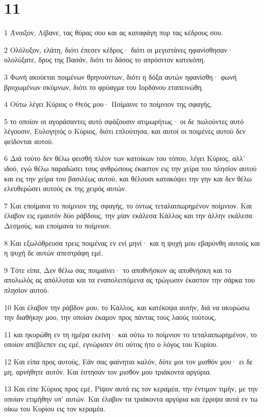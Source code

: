 \chapter{11}

\par 1 Άνοιξον, Λίβανε, τας θύρας σου και ας καταφάγη πυρ τας κέδρους σου.
\par 2 Ολόλυξον, ελάτη, διότι έπεσεν κέδρος· διότι οι μεγιστάνες ηφανίσθησαν· ολολύξατε, δρυς της Βασάν, διότι το δάσος το απρόσιτον κατεκόπη.
\par 3 Φωνή ακούεται ποιμένων θρηνούντων, διότι η δόξα αυτών ηφανίσθη· φωνή βρυχωμένων σκύμνων, διότι το φρύαγμα του Ιορδάνου εταπεινώθη.
\par 4 Ούτω λέγει Κύριος ο Θεός μου· Ποίμαινε το ποίμνιον της σφαγής,
\par 5 το οποίον οι αγοράσαντες αυτό σφάζουσιν ατιμωρήτως· οι δε πωλούντες αυτό λέγουσιν, Ευλογητός ο Κύριος, διότι επλούτησα, και αυτοί οι ποιμένες αυτού δεν φείδονται αυτού.
\par 6 Διά τούτο δεν θέλω φεισθή πλέον των κατοίκων του τόπου, λέγει Κύριος, αλλ' ιδού, εγώ θέλω παραδώσει τους ανθρώπους έκαστον εις την χείρα του πλησίον αυτού και εις την χείρα του βασιλέως αυτού, και θέλουσι κατακόψει την γην και δεν θέλω ελευθερώσει αυτούς εκ της χειρός αυτών.
\par 7 Και εποίμανα το ποίμνιον της σφαγής, το όντως τεταλαιπωρημένον ποίμνιον. Και έλαβον εις εμαυτόν δύο ράβδους, την μίαν εκάλεσα Κάλλος και την άλλην εκάλεσα Δεσμούς, και εποίμανα το ποίμνιον.
\par 8 Και εξωλόθρευσα τρεις ποιμένας εν ενί μηνί· και η ψυχή μου εβαρύνθη αυτούς και η ψυχή δε αυτών απεστράφη εμέ.
\par 9 Τότε είπα, Δεν θέλω σας ποιμαίνει· το αποθνήσκον ας αποθνήσκη και το απολωλός ας απόλλυται και τα εναπολειπόμενα ας τρώγωσιν έκαστον την σάρκα του πλησίον αυτού.
\par 10 Και έλαβον την ράβδον μου, το Κάλλος, και κατέκοψα αυτήν, διά να ακυρώσω την διαθήκην μου, την οποίαν έκαμον προς πάντας τους λαούς τούτους,
\par 11 και ηκυρώθη εν τη ημέρα εκείνη· και ούτω το ποίμνιον το τεταλαιπωρημένον, το οποίον απέβλεπεν εις εμέ, εγνώρισεν ότι ούτος ήτο ο λόγος του Κυρίου.
\par 12 Και είπα προς αυτούς, Εάν σας φαίνηται καλόν, δότε μοι τον μισθόν μου· ει δε μη, αρνήθητε αυτόν. Και έστησαν τον μισθόν μου τριάκοντα αργύρια.
\par 13 Και είπε Κύριος προς εμέ, Ρίψον αυτά εις τον κεραμέα, την έντιμον τιμήν, με την οποίαν ετιμήθην υπ' αυτών. Και έλαβον τα τριάκοντα αργύρια και έρριψα αυτά εν τω οίκω του Κυρίου εις τον κεραμέα.
